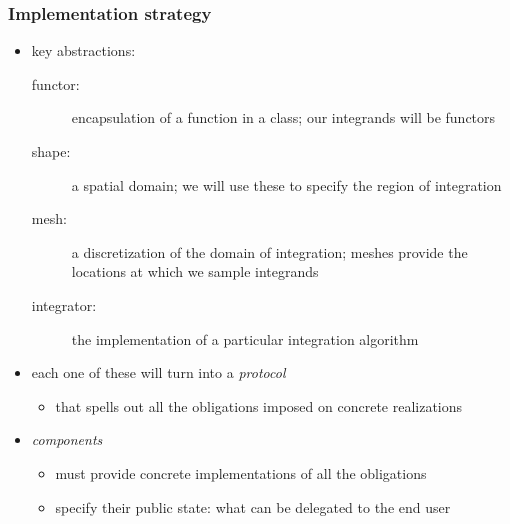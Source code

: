 \begin{frame}
%
  \frametitle{Implementation strategy}
%
  \begin{itemize}
%
  \item key abstractions:
    \begin{description}
    \item[functor:] encapsulation of a function in a class; our integrands will be functors
    \item[shape:] a spatial domain; we will use these to specify the region of integration
    \item[mesh:] a discretization of the domain of integration; meshes provide the locations at
      which we sample integrands
    \item[integrator:] the implementation of a particular integration algorithm
    \end{description}
%
  \item each one of these will turn into a {\em protocol}
    \begin{itemize}
    \item that spells out all the obligations imposed on concrete realizations
    \end{itemize}
%
  \item {\em components}
    \begin{itemize}
    \item must provide concrete implementations of all the obligations
    \item specify their public state: what can be delegated to the end user
    \end{itemize}
%
  \end{itemize}
%
\end{frame}

